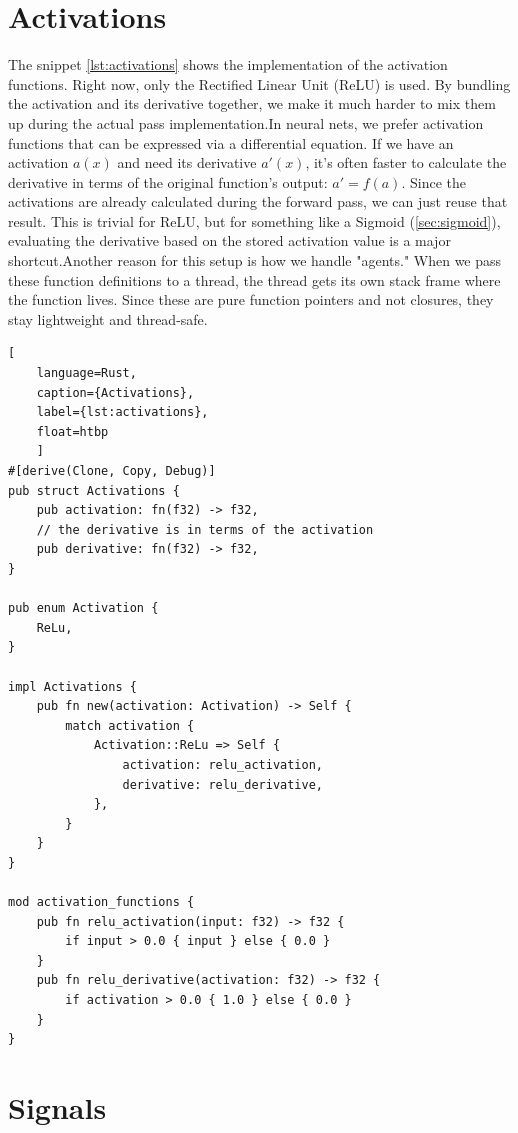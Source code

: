 \newpage\section{Activations}
The snippet \ref{lst:activations} shows the implementation of the activation functions. Right now, only the Rectified Linear Unit (ReLU) is used. By bundling the activation and its derivative together, we make it much harder to mix them up during the actual pass implementation.In neural nets, we prefer activation functions that can be expressed via a differential equation. If we have an activation $a(x)$ and need its derivative $a'(x)$, it’s often faster to calculate the derivative in terms of the original function's output: $a' = f(a)$. Since the activations are already calculated during the forward pass, we can just reuse that result. This is trivial for ReLU, but for something like a Sigmoid (\ref{sec:sigmoid}), evaluating the derivative based on the stored activation value is a major shortcut.Another reason for this setup is how we handle "agents." When we pass these function definitions to a thread, the thread gets its own stack frame where the function lives. Since these are pure function pointers and not closures, they stay lightweight and thread-safe.
\begin{lstlisting}[
	language=Rust, 
	caption={Activations}, 
	label={lst:activations},
	float=htbp
	]
#[derive(Clone, Copy, Debug)]
pub struct Activations {
	pub activation: fn(f32) -> f32,
	// the derivative is in terms of the activation
	pub derivative: fn(f32) -> f32,
}

pub enum Activation {
	ReLu,
}

impl Activations {
	pub fn new(activation: Activation) -> Self {
		match activation {
			Activation::ReLu => Self {
				activation: relu_activation,
				derivative: relu_derivative,
			},
		}
	}
}

mod activation_functions {
	pub fn relu_activation(input: f32) -> f32 {
		if input > 0.0 { input } else { 0.0 }
	}
	pub fn relu_derivative(activation: f32) -> f32 {
		if activation > 0.0 { 1.0 } else { 0.0 }
	}
}
\end{lstlisting}
\newpage\section{Signals}
